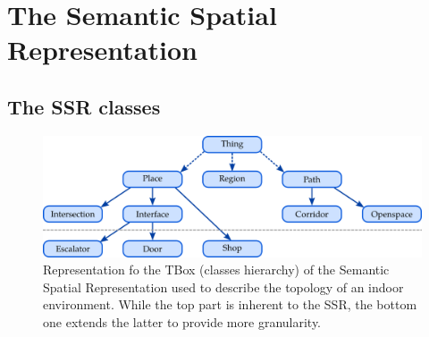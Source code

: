 


\section{The Semantic Spatial Representation}

\subsection{The SSR classes}

\begin{figure}[ht!]
\centering
\includegraphics[scale=0.4]{figures/chapter3/ssr_tbox.png}
\caption{\label{fig:chap3_tbox} Representation fo the TBox (classes hierarchy) of the Semantic Spatial Representation used to describe the topology of an indoor environment. While the top part is inherent to the SSR, the bottom one extends the latter to provide more granularity.}
\end{figure}

